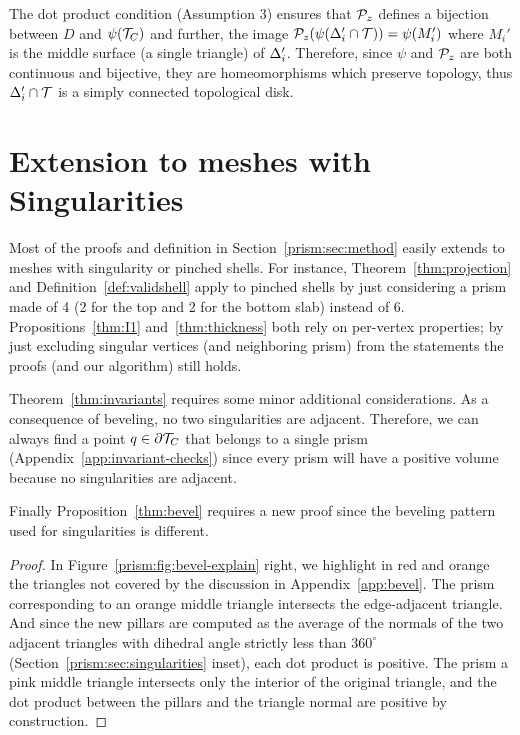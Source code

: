 The dot product condition (Assumption 3) ensures that $\P_z$ defines a bijection between $D$ and $\psi(\T_C)$\revision{;} and further, the image  $\P_z(\psi(\Prism_i'\cap \T)) = \psi(M_i')$ where $M_i'$ is the middle surface (a single triangle) of $\Prism_i'$.
Therefore, since $\psi$ and $\P_z$ are both continuous and bijective, they are homeomorphisms which preserve topology, 
thus $\Prism_i'\cap \T $ is a simply connected topological disk.


\section{Extension to meshes with Singularities}\label{app:singularity}
Most of the proofs and definition in Section~\ref{prism:sec:method} easily extends to meshes with singularity or pinched shells. For instance,
 Theorem~\ref{thm:projection} and Definition~\ref{def:validshell} apply to pinched shells by just considering a prism made of 4 (2 for the top and 2 for the bottom slab) instead of 6. Propositions~\ref{thm:I1} and~\ref{thm:thickness} both rely on per-vertex properties; by just excluding singular vertices (and neighboring prism) from the statements the proofs (and our algorithm) still holds.


Theorem~\ref{thm:invariants} requires some minor additional considerations. As a consequence of beveling, no two singularities are adjacent. Therefore, we can always find a point $q \in \partial \T_C$ that belongs to a single prism (Appendix~\ref{app:invariant-checks}) since every prism will have a positive volume
because no singularities are adjacent.


Finally Proposition~\ref{thm:bevel} requires a new proof since the beveling pattern used for singularities is different.
\begin{proof}
In  Figure~\ref{prism:fig:bevel-explain} right, we highlight in red and orange the triangles not covered by the discussion in Appendix~\ref{app:bevel}. 
The prism corresponding to an orange middle triangle intersects the edge-adjacent triangle. And since the new pillars are computed as the average of the normals of the two adjacent triangles with dihedral angle strictly less than $360^\circ$ 
 (Section~\ref{prism:sec:singularities} inset), each dot product is positive. 
The prism  a pink middle triangle intersects only the interior of the original triangle, and the dot product between the pillars and the triangle normal are positive by construction. %
\end{proof}



